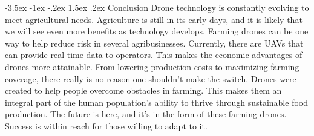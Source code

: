 \documentclass[a4paper,10pt]{article}
\makeatletter
\theoremstyle{definition}
\renewcommand\section{\@startsection {section}{1}{\z@}%
                                   {-3.5ex \@plus -1ex \@minus -.2ex}%
                                   {1.5ex \@plus.2ex}%
                                   {\large\bfseries}}
\makeatother
\begin{document}
\newpage
\section{Conclusion}
\label{sec:4}
Drone technology is constantly evolving to meet agricultural needs. Agriculture is still in its early days, and it is likely that we will see even more benefits as technology develops. 
Farming drones can be one way to help reduce risk in several agribusinesses. Currently, there are UAVs that can provide real-time data to operators. This makes the economic advantages of drones more attainable. From lowering production costs to maximizing farming coverage, there really is no reason one shouldn’t make the switch. Drones were created to help people overcome obstacles in farming. This makes them an integral part of the human population’s ability to thrive through sustainable food production. The future is here, and it’s in the form of these farming drones. Success is within reach for those willing to adapt to it.

\newpage

\begingroup
\makeatletter
\renewcommand\section{\@startsection {section}{1}{\z@}%
                                   {-3.5ex \@plus -1ex \@minus -.2ex}%
                                   {4.5ex \@plus.2ex}%
                                   {\large\bfseries}}
\makeatother




\endgroup
\end{document}
